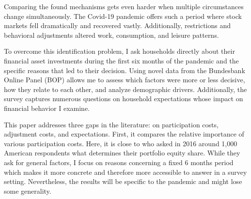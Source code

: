 \documentclass[ProjectABM]{subfiles}
\begin{document}
Comparing the found mechanisms gets even harder when multiple circumstances change simultaneously. The Covid-19 pandemic offers such a period where stock markets fell dramatically and recovered vastly. Additionally, restrictions and behavioral adjustments altered work, consumption, and leisure patterns.

 To overcome this identification problem, I ask households directly about their financial asset investments during the first six months of the pandemic and the specific reasons that led to their decision. 
 Using novel data from the Bundesbank Online Panel (BOP) allows me to assess which factors were more or less decisive, how they relate to each other, and analyze demographic drivers. 
 Additionally, the survey captures numerous questions on household expectations whose impact on financial behavior I examine. %



This paper addresses three gaps in the literature: on participation costs, adjustment costs, and expectations. First, it compares the relative importance of various participation costs. Here, it is close to \cite{choi_2020} who asked in 2016 around 1,000 American respondents what determines their portfolio equity share. While they ask for general factors, I focus on reasons concerning a fixed 6 months period which makes it more concrete and therefore more accessible to answer in a survey setting. Nevertheless, the results will be specific to the pandemic and might lose some generality. %
\end{document}
